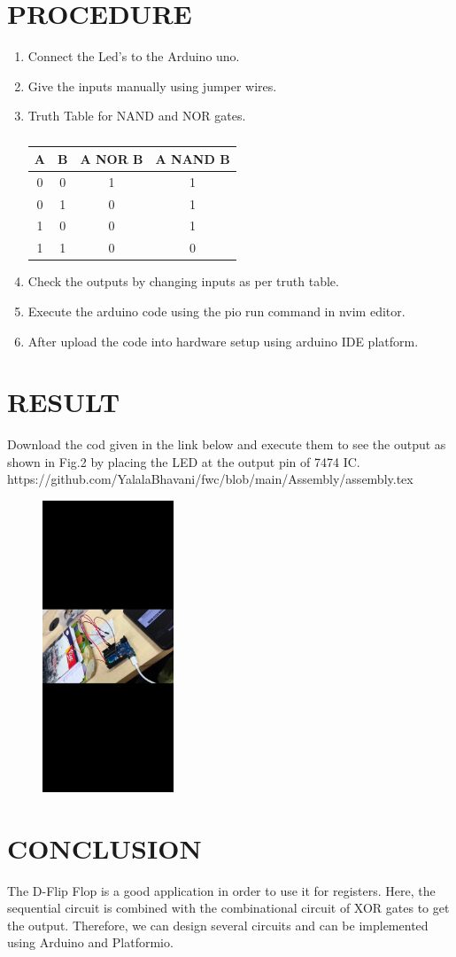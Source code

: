 \documentclass[conference]{IEEEtran}
\begin{document}
\section{PROCEDURE}
\begin{enumerate}
	 \item Connect the Led's to the Arduino uno.
	 \item Give the inputs manually using jumper wires.
	 \item Truth Table for NAND and NOR gates.
		 \begin{table}[htbp]
			 \centering
			 \begin{tabular}{|c|c|c|c|}
				 \hline
				 A & B & A NOR B & A NAND B \\
				 \hline
				 0 & 0 & 1 & 1 \\
				 \hline
				 0 & 1 & 0 & 1 \\
				 \hline
				 1 & 0 & 0 & 1 \\
				 \hline
				 1 & 1 & 0 & 0 \\
				 \hline
			 \end{tabular}
			 \vspace{0.1cm}
			 \caption{\label{tab:widgets}}
		 \end{table}
	 \item Check the outputs by changing inputs as per truth table.
	 \item Execute the arduino code using the pio run command in nvim editor.
	 \item After upload the code into hardware setup using arduino IDE platform.
 \end{enumerate}
 \section{RESULT}
 Download the cod given in the link below and execute them to see the output as shown in Fig.2 by placing the LED at the output pin of 7474 IC. 
https://github.com/YalalaBhavani/fwc/blob/main/Assembly/assembly.tex
\begin{figure}[h] 
	\centering 
	\includegraphics[width=0.35\textwidth]{Fig3}
	\caption{\label{fig:Gates}}    
\end{figure}
\section{CONCLUSION}
The D-Flip Flop is a good application in order to use it for registers. Here, the sequential circuit is combined with the combinational circuit of XOR gates to get the output. Therefore, we can design several circuits and can be implemented using Arduino and Platformio.
\end{document}
